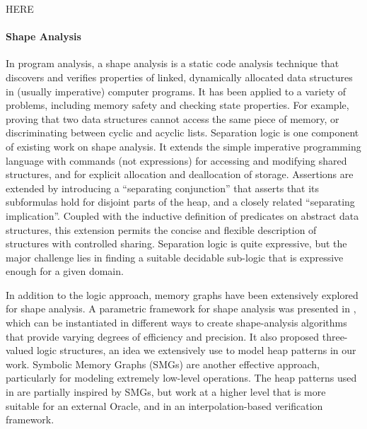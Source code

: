 HERE
\cite{wenchao-thesis}
\cite{jha-arxiv15}
\cite{sagiv2016}






\paragraph{Shape Analysis}
In program analysis, a shape analysis is a static code analysis technique that discovers
and verifies properties of linked, dynamically allocated data structures in (usually
imperative) computer programs. It has been applied to a variety of problems, including
memory safety and checking state properties. For example, proving that two data
structures cannot access the same piece of memory, or discriminating between cyclic and
acyclic lists. Separation logic \cite{calcagano11,reynolds02} is one component of
existing work on shape analysis. It extends the simple imperative programming language
with commands (not expressions) for accessing and modifying shared structures, and for
explicit allocation and deallocation of storage. Assertions are extended by introducing
a ``separating conjunction'' that asserts that its subformulas hold for disjoint parts
of the heap, and a closely related ``separating implication''. Coupled with the
inductive definition of predicates on abstract data structures, this extension permits
the concise and flexible description of structures with controlled sharing. Separation
logic is quite expressive, but the major challenge lies in finding a suitable decidable
sub-logic that is expressive enough for a given domain.

In addition to the logic approach, memory graphs have been extensively explored for
shape analysis. A parametric framework for shape analysis was presented in
\cite{sagiv02}, which can be instantiated in different ways to create shape-analysis
algorithms that provide varying degrees of efficiency and precision. It also proposed
three-valued logic structures, an idea we extensively use to model heap patterns in our
work. Symbolic Memory Graphs (SMGs) \cite{dudka13} are another effective approach,
particularly for modeling extremely low-level operations. The heap patterns used in
\verifier are partially inspired by SMGs, but work at a higher level that is more
suitable for an external Oracle, and in an interpolation-based verification framework.

